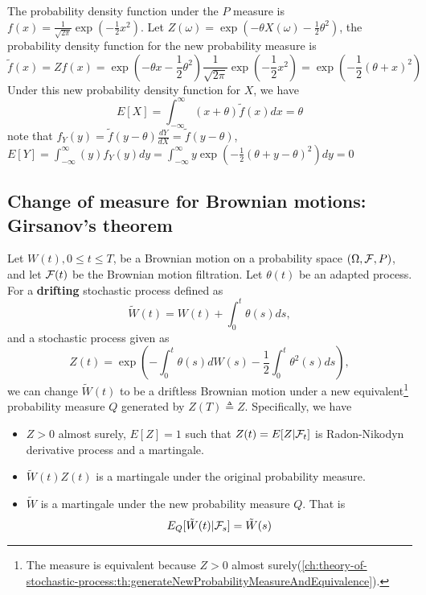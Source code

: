 \begin{refsection}
\begin{example}
	The probability density function under the $P$ measure is $f(x) = \frac{1}{\sqrt{2\pi}}\exp(-\frac{1}{2}x^2)$. Let $Z(\omega) = \exp(-\theta X(\omega) - \frac{1}{2}\theta^2)$, the probability density function for the new probability measure is $$\tilde{f}(x) = Zf(x) = \exp(-\theta x - \frac{1}{2}\theta^2)\frac{1}{\sqrt{2\pi}}\exp(-\frac{1}{2}x^2) = \exp(-\frac{1}{2}(\theta + x)^2)$$
	Under this new probability density function for $X$, we have
	$$E[X] = \int_{-\infty}^\infty (x+\theta)\tilde{f}(x)dx = \theta$$
	note that $f_Y(y) = \tilde{f}(y-\theta)\frac{dY}{dX}=\tilde{f}(y-\theta)$,
	$E[Y] = \int_{-\infty}^\infty (y)f_Y(y)dy = \int_{-\infty}^\infty y\exp(-\frac{1}{2}(\theta + y - \theta)^2)dy = 0$
\end{example}
\subsection{Change of measure for Brownian motions: Girsanov's theorem}


\begin{theorem}\label{ch:theory-of-stochastic-process:th:Girsanovtheorem}
	\cite[212]{shreve2004stochastic2} Let $W(t),0\leq t \leq T$, be a Brownian motion on a probability space $(\Omega,\mathcal{F},P)$, and let $\mathcal{F}(t)$ be the Brownian motion filtration. Let $\theta(t)$ be an adapted process. For a \textbf{drifting} stochastic process defined as
	$$\tilde{W}(t) = W(t) + \int_0^t \theta(s)ds,$$
	and a stochastic process given as
	$$Z(t) = \exp(-\int_0^t \theta(s)dW(s) - \frac{1}{2}\int_0^t \theta^2(s)ds),$$
	we can change $\tilde{W}(t)$ to be a driftless Brownian motion under a new equivalent\footnote{The measure is equivalent because $Z > 0$ almost surely(\autoref{ch:theory-of-stochastic-process:th:generateNewProbabilityMeasureAndEquivalence}).} probability measure $Q$ generated by $Z(T)  \triangleq Z$. Specifically, we have
	\begin{itemize}
		\item $Z > 0$ almost surely, $E[Z] = 1$  such that $Z(t) = E[Z|\mathcal{F}_t]$ is Radon-Nikodyn derivative process and a martingale.
		\item $\tilde{W}(t)Z(t)$ is a martingale under the original probability measure.
		\item  $\tilde{W}$ is a martingale under the new probability measure  $Q$. That is
		$$E_Q[\tilde{W}(t)|\mathcal{F}_s] = \tilde{W}(s)$$
		

\end{itemize}
\end{theorem}
\end{refsection}
